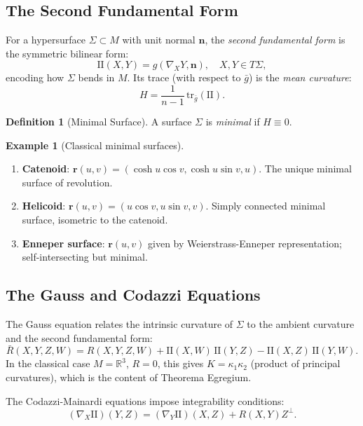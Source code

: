 \documentclass[12pt,a4paper]{amsart}
\theoremstyle{definition}
\newtheorem{definition}[theorem]{Definition}
\newtheorem{example}[theorem]{Example}
\begin{document}
\subsection{The Second Fundamental Form}

For a hypersurface $\Sigma \subset M$ with unit normal $\mathbf{n}$,
the \emph{second fundamental form} is the symmetric bilinear form:
\[
  \mathrm{II}(X,Y) = g(\nabla_X Y, \mathbf{n}), \quad X, Y \in T\Sigma,
\]
encoding how $\Sigma$ bends in $M$. Its trace (with respect to $\bar{g}$)
is the \emph{mean curvature}:
\[
  H = \frac{1}{n-1}\,\mathrm{tr}_{\bar{g}}(\mathrm{II}).
\]

\begin{definition}[Minimal Surface]
A surface $\Sigma$ is \emph{minimal} if $H \equiv 0$.
\end{definition}

\begin{example}[Classical minimal surfaces]
\begin{enumerate}[label=(\alph*)]
  \item \textbf{Catenoid}: $\mathbf{r}(u,v) = (\cosh u \cos v, \cosh u \sin v, u)$.
        The unique minimal surface of revolution.
  \item \textbf{Helicoid}: $\mathbf{r}(u,v) = (u\cos v, u\sin v, v)$.
        Simply connected minimal surface, isometric to the catenoid.
  \item \textbf{Enneper surface}: $\mathbf{r}(u,v)$ given by Weierstrass-Enneper
        representation; self-intersecting but minimal.
\end{enumerate}
\end{example}

\subsection{The Gauss and Codazzi Equations}

The Gauss equation relates the intrinsic curvature of $\Sigma$ to the
ambient curvature and the second fundamental form:
\[
  \bar{R}(X,Y,Z,W) = R(X,Y,Z,W)
  + \mathrm{II}(X,W)\,\mathrm{II}(Y,Z) - \mathrm{II}(X,Z)\,\mathrm{II}(Y,W).
\]
In the classical case $M = \mathbb{R}^3$, $R = 0$, this gives
$K = \kappa_1 \kappa_2$ (product of principal curvatures), which is the
content of Theorema Egregium.

The Codazzi-Mainardi equations impose integrability conditions:
\[
  (\nabla_X \mathrm{II})(Y,Z) = (\nabla_Y \mathrm{II})(X,Z) + R(X,Y)Z^{\perp}.
\]
\end{document}
